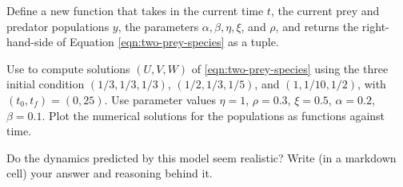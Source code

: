 \begin{problem}
Define a new function  that takes in the current time $t$, the current prey and predator populations $y$, the parameters $\alpha,\beta,\eta,\xi$, and $\rho$, and returns the right-hand-side of Equation \eqref{eqn:two-prey-species} as a tuple.

Use  to compute solutions $(U,V,W)$ of \eqref{eqn:two-prey-species} using the three initial condition $(1/3,1/3,1/3)$, $(1/2,1/3,1/5)$, and $(1,1/10,1/2)$, with $(t_0,t_f)=(0,25)$.
Use parameter values $\eta=1$, $\rho=0.3$, $\xi=0.5$, $\alpha=0.2$, $\beta=0.1$.
Plot the numerical solutions for the populations as functions against time.

Do the dynamics predicted by this model seem realistic?
Write (in a markdown cell) your answer and reasoning behind it.
\end{problem}


